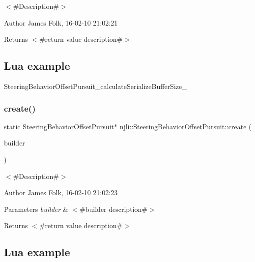 $<$\#\+Description\#$>$ 

\begin{DoxyAuthor}{Author}
James Folk, 16-\/02-\/10 21\+:02\+:21
\end{DoxyAuthor}
\begin{DoxyReturn}{Returns}
$<$\#return value description\#$>$
\end{DoxyReturn}
\hypertarget{classnjli_1_1_steering_behavior_wander_ex1}{}\subsection{Lua example}\label{classnjli_1_1_steering_behavior_wander_ex1}

\begin{DoxyCodeInclude}
\end{DoxyCodeInclude}
Steering\+Behavior\+Offset\+Pursuit\+\_\+calculate\+Serialize\+Buffer\+Size\+\_\+ \mbox{\label{classnjli_1_1_steering_behavior_offset_pursuit_a0b3f8be430c7cb2f5b82e80c0f3c06d0}} 
\subsubsection{\texorpdfstring{create()}{create()}\hspace{0.1cm}{\footnotesize\ttfamily [2/2]}}
{\footnotesize\ttfamily static \mbox{\hyperlink{classnjli_1_1_steering_behavior_offset_pursuit}{Steering\+Behavior\+Offset\+Pursuit}}$\ast$ njli\+::\+Steering\+Behavior\+Offset\+Pursuit\+::create (\begin{DoxyParamCaption}\item[{const \mbox{\hyperlink{classnjli_1_1_steering_behavior_offset_pursuit_builder}{Steering\+Behavior\+Offset\+Pursuit\+Builder}} \&}]{builder }\end{DoxyParamCaption})\hspace{0.3cm}{\ttfamily [static]}}



$<$\#\+Description\#$>$ 

\begin{DoxyAuthor}{Author}
James Folk, 16-\/02-\/10 21\+:02\+:23
\end{DoxyAuthor}

\begin{DoxyParams}{Parameters}
{\em builder} & $<$\#builder description\#$>$\\
\hline
\end{DoxyParams}
\begin{DoxyReturn}{Returns}
$<$\#return value description\#$>$
\end{DoxyReturn}
\hypertarget{classnjli_1_1_steering_behavior_wander_ex1}{}\subsection{Lua example}\label{classnjli_1_1_steering_behavior_wander_ex1}

